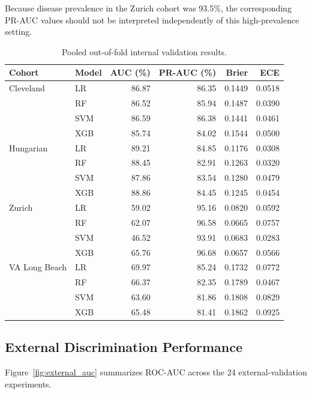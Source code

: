 \documentclass[10pt,journal,twocolumn]{IEEEtran}
\begin{document}
Because disease prevalence in the Zurich cohort was 93.5\%, the corresponding PR-AUC values should not be interpreted independently of this high-prevalence setting.

\begin{table}[!b]
\centering
\caption{Pooled out-of-fold internal validation results.}
\label{tab:internal_validation}
\scriptsize
\setlength{\tabcolsep}{6pt}
\begin{tabular}{llrrrr}
\toprule
\textbf{Cohort} & \textbf{Model} & \textbf{AUC (\%)} & \textbf{PR-AUC (\%)} & \textbf{Brier} & \textbf{ECE} \\
\midrule
Cleveland & LR  & 86.87 & 86.35 & 0.1449 & 0.0518 \\
           & RF  & 86.52 & 85.94 & 0.1487 & 0.0390 \\
           & SVM & 86.59 & 86.38 & 0.1441 & 0.0461 \\
           & XGB & 85.74 & 84.02 & 0.1544 & 0.0500 \\
\midrule
Hungarian & LR  & 89.21 & 84.85 & 0.1176 & 0.0308 \\
          & RF  & 88.45 & 82.91 & 0.1263 & 0.0320 \\
          & SVM & 87.86 & 83.54 & 0.1280 & 0.0479 \\
          & XGB & 88.86 & 84.45 & 0.1245 & 0.0454 \\
\midrule
Zurich & LR  & 59.02 & 95.16 & 0.0820 & 0.0592 \\
       & RF  & 62.07 & 96.58 & 0.0665 & 0.0757 \\
       & SVM & 46.52 & 93.91 & 0.0683 & 0.0283 \\
       & XGB & 65.76 & 96.68 & 0.0657 & 0.0566 \\
\midrule
VA Long Beach & LR  & 69.97 & 85.24 & 0.1732 & 0.0772 \\
              & RF  & 66.37 & 82.35 & 0.1789 & 0.0467 \\
              & SVM & 63.60 & 81.86 & 0.1808 & 0.0829 \\
              & XGB & 65.48 & 81.41 & 0.1862 & 0.0925 \\
\bottomrule
\end{tabular}
\end{table}

\subsection{External Discrimination Performance}

Figure~\ref{fig:external_auc} summarizes ROC-AUC across the 24 external-validation experiments.
\end{document}

